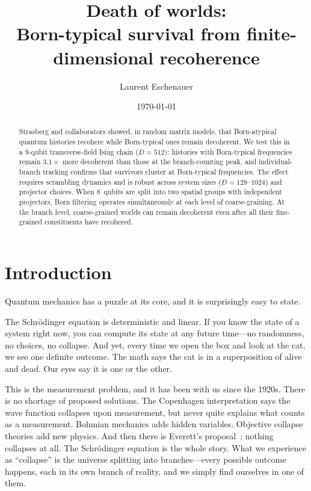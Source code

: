 \documentclass[aps,prd,twocolumn,showpacs,preprintnumbers,amsmath,amssymb,nofootinbib]{revtex4-2}
\begin{document}
\title{Death of worlds:\\
Born-typical survival from finite-dimensional recoherence}

\author{Laurent Eschenauer}

\date{\today}

\begin{abstract}
Strasberg and collaborators showed, in random matrix models, that
Born-atypical quantum histories recohere while Born-typical ones remain
decoherent.  We test this in a 9-qubit transverse-field Ising chain
($D = 512$): histories with Born-typical frequencies remain $3.1\times$ more
decoherent than those at the branch-counting peak, and individual-branch
tracking confirms that survivors cluster at Born-typical frequencies.  The effect requires scrambling dynamics and is robust across
system sizes ($D = 128$--$1024$) and projector choices.
When 8~qubits are split into two spatial groups with independent projectors,
Born filtering operates simultaneously at each level of coarse-graining.
At the branch level, coarse-grained worlds can remain decoherent even after
all their fine-grained constituents have recohered.
\end{abstract}

\maketitle


\section{Introduction}
\label{sec:intro}

Quantum mechanics has a puzzle at its core, and it is surprisingly easy to state.

The Schr\"odinger equation is deterministic and linear. If you know the state of a
system right now, you can compute its state at any future time---no randomness, no
choices, no collapse. And yet, every time we open the box and look at the cat, we
see one definite outcome. The math says the cat is in a superposition of alive and
dead. Our eyes say it is one or the other.

This is the measurement problem, and it has been with us since the 1920s. There is
no shortage of proposed solutions. The Copenhagen interpretation says the wave
function collapses upon measurement, but never quite explains what counts as a
measurement. Bohmian mechanics adds hidden variables. Objective collapse theories
add new physics. And then there is Everett's proposal~\cite{Everett1957}: nothing
collapses at all. The Schr\"odinger equation is the whole story. What we experience
as ``collapse'' is the universe splitting into branches---every possible outcome
happens, each in its own branch of reality, and we simply find ourselves in one of
them.
\end{document}
